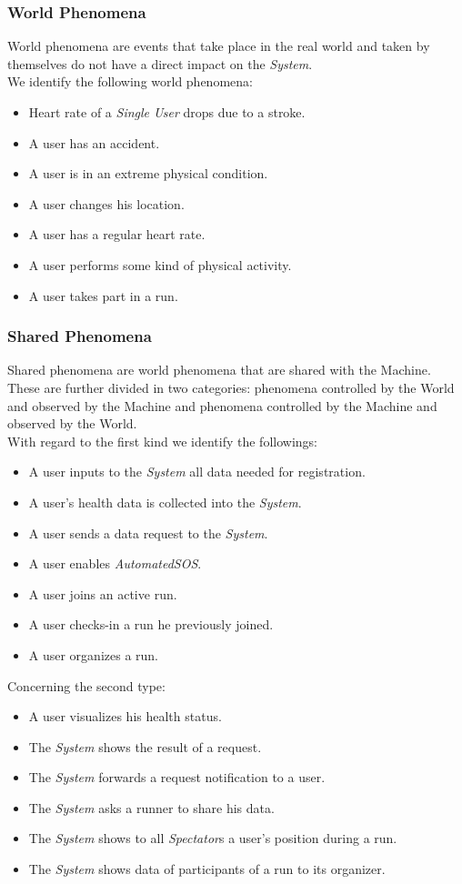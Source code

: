 \documentclass[titlepage]{article}
\begin{document}
		\subsubsection{World Phenomena}
		World phenomena are events that take place in the real world and taken by themselves do not have a direct impact on the {\it System}.\\
We identify the following world phenomena:
		\begin{itemize}
			\item Heart rate of a {\it Single User} drops due to a stroke.
			\item A user has an accident.
			\item A user is in an extreme physical condition.
			\item A user changes his location.
			\item A user has a regular heart rate.
			\item A user performs some kind of physical activity.
			\item A user takes part in a run.
		\end{itemize}

		\subsubsection{Shared Phenomena}
		Shared phenomena are world phenomena that are shared with the Machine.\\
These are further divided in two categories: phenomena controlled by the World and observed by the Machine and phenomena controlled by the Machine and observed by the World.\\
With regard to the first kind we identify the followings:
		\begin{itemize}
			\item A user inputs to the {\it System} all data needed for registration.
			\item A user’s health data is collected into the {\it System}.
			\item A user sends a data request to the {\it System}.
			\item A user enables {\it AutomatedSOS}.
			\item A user joins an active run.
			\item A user checks-in a run he previously joined.
			\item A user organizes a run.\\
		\end{itemize}
Concerning the second type:	
		\begin{itemize}
			\item A user visualizes his health status.
			\item The {\it System} shows the result of a request.
			\item The {\it System} forwards a request notification to a user.
			\item The {\it System} asks a runner to share his data.
			\item The {\it System} shows to all {\it Spectator}s a user’s position during a run.
			\item The {\it System} shows data of participants of a run to its organizer.
		\end{itemize}	
		
\end{document}

